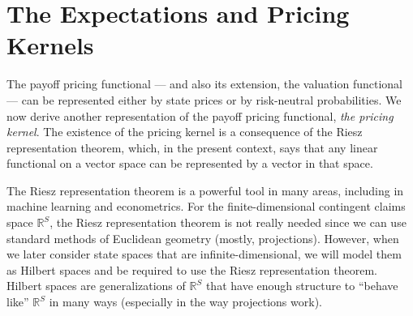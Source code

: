 \documentclass[\topdir/lecture\_notes.tex]{subfiles}
\begin{document}

\section{The Expectations and Pricing Kernels}
The payoff pricing functional --- and also its extension, the valuation functional --- can be represented either by state prices or by risk-neutral probabilities. We now derive another representation of the payoff pricing functional, \emph{the pricing kernel}. The existence of the pricing kernel is a consequence of the Riesz representation theorem, which, in the present context, says that any linear functional on a vector space can be represented by a vector in that space.

The Riesz representation theorem is a powerful tool in many areas, including in machine learning and econometrics. For the finite-dimensional contingent claims space $\mathbb{R}^{S}$, the Riesz representation theorem is not really needed since we can use standard methods of Euclidean geometry (mostly, projections). However, when we later consider state spaces that are infinite-dimensional, we will model them as Hilbert spaces and be required to use the Riesz representation theorem. Hilbert spaces are generalizations of $\mathbb{R}^S$ that have enough structure to ``behave like'' $\mathbb{R}^S$ in many ways (especially in the way projections work).
\end{document}
